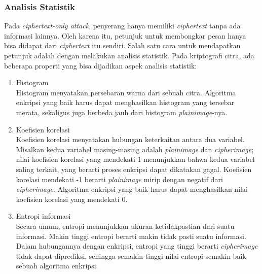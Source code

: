 \subsubsection{Analisis Statistik}
Pada \emph{ciphertext-only attack}, penyerang hanya memiliki \emph{ciphertext} tanpa ada informasi
lainnya. Oleh karena itu, petunjuk untuk membongkar pesan hanya bisa didapat dari \emph{ciphertext}
itu sendiri. Salah satu cara untuk mendapatkan petunjuk adalah dengan melakukan  analisis statistik.
Pada kriptografi citra, ada beberapa properti yang bisa dijadikan aspek analisis statistik:
\begin{enumerate}[label=\alph*.]
	\item Histogram\\
Histogram menyatakan persebaran warna dari sebuah citra. Algoritma enkripsi yang baik harus dapat
menghasilkan histogram yang tersebar merata, sekaligus juga berbeda jauh dari histogram \emph{plainimage}-nya.
	\item Koefisien korelasi\\
Koefisien korelasi menyatakan hubungan keterkaitan antara dua variabel. Misalkan kedua variabel
masing-masing adalah \emph{plainimage} dan \emph{cipherimage}; nilai koefisien korelasi yang
mendekati 1 menunjukkan bahwa kedua variabel saling terkait, yang berarti proses enkripsi dapat
dikatakan gagal. Koefisien korelasi mendekati -1 berarti \emph{plainimage} mirip dengan negatif dari
\emph{cipherimage}. Algoritma enkripsi yang baik harus dapat menghasilkan nilai koefisien korelasi
yang mendekati 0.
	\item Entropi informasi\\
Secara umum, entropi menunjukkan ukuran ketidakpastian dari suatu informasi. Makin tinggi entropi
berarti makin tidak pasti suatu informasi. Dalam hubungannya dengan enkripsi, entropi yang tinggi
berarti \emph{cipherimage} tidak dapat diprediksi, sehingga semakin tinggi nilai entropi semakin
baik sebuah algoritma enkripsi.
\end{enumerate}


